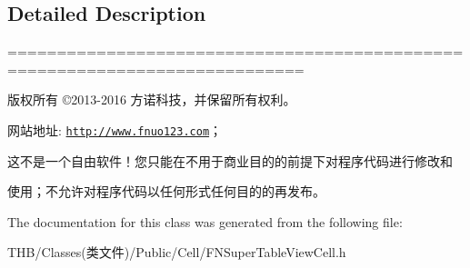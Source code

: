 \subsection{Detailed Description}
============================================================================

版权所有 ©2013-\/2016 方诺科技，并保留所有权利。

网站地址\+: \href{http://www.fnuo123.com}{\tt http\+://www.\+fnuo123.\+com}； 



这不是一个自由软件！您只能在不用于商业目的的前提下对程序代码进行修改和

使用；不允许对程序代码以任何形式任何目的的再发布。 

 

The documentation for this class was generated from the following file\+:\begin{DoxyCompactItemize}
\item 
T\+H\+B/\+Classes(类文件)/\+Public/\+Cell/F\+N\+Super\+Table\+View\+Cell.\+h\end{DoxyCompactItemize}
